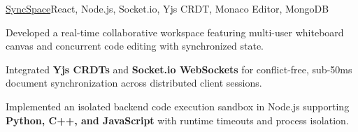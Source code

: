 \begin{cvproject}{\uline{SyncSpace}}{React, Node.js, Socket.io, Yjs CRDT, Monaco Editor, MongoDB}
    \item Developed a real-time collaborative workspace featuring multi-user whiteboard canvas and concurrent code editing with synchronized state.
    \item Integrated \textbf{Yjs CRDTs} and \textbf{Socket.io WebSockets} for conflict-free, sub-50ms document synchronization across distributed client sessions.
    \item Implemented an isolated backend code execution sandbox in Node.js supporting \textbf{Python, C++, and JavaScript} with runtime timeouts and process isolation.
\end{cvproject}
